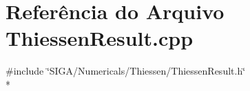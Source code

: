 \section{Referência do Arquivo Thiessen\+Result.\+cpp}
\label{_thiessen_result_8cpp}
{\ttfamily \#include \char`\"{}S\+I\+G\+A/\+Numericals/\+Thiessen/\+Thiessen\+Result.\+h\char`\"{}}\\*
